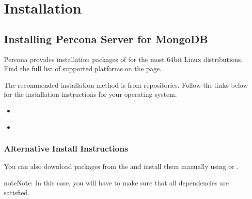 \documentclass[letterpaper,10pt,english]{sphinxmanual}
\begin{document}
\part{Installation}
\label{\detokenize{index:installation}}

\chapter{Installing Percona Server for MongoDB}
\label{\detokenize{install/index:installing-percona-server-for-mongodb}}\label{\detokenize{install/index:install}}\label{\detokenize{install/index::doc}}
\sphinxAtStartPar
Percona provides installation packages of  for the most 64\sphinxhyphen{}bit Linux distributions. Find the full list of supported platforms on the  page.

\sphinxAtStartPar
The recommended installation method is from  repositories. Follow the links below for the installation instructions for your operating system.
\begin{itemize}
\item {} 
\sphinxAtStartPar
{\hyperref[\detokenize{install/apt:apt}]{}}

\item {} 
\sphinxAtStartPar
{\hyperref[\detokenize{install/yum:yum}]{}}

\end{itemize}


\section{Alternative Install Instructions}
\label{\detokenize{install/index:alternative-install-instructions}}
\sphinxAtStartPar
You can also download packages from the  and install them
manually using  or .

\begin{sphinxadmonition}{note}{Note:}
\sphinxAtStartPar
In this case, you will have to make sure that all dependencies are satisfied.
\end{sphinxadmonition}
\end{document}
